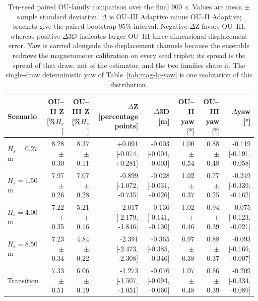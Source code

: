 
\begin{table}[t]
  \centering
  \caption{Ten-seed paired OU-family comparison over the final \SI{900}{s}. Values are mean $\pm$ sample standard deviation. $\Delta$ is OU--III Adaptive minus OU--II Adaptive; brackets give the paired bootstrap 95\% interval. Negative $\Delta$Z favors OU--III, whereas positive $\Delta$3D indicates larger OU--III three-dimensional displacement error. Yaw is carried alongside the displacement channels because the ensemble redraws the magnetometer calibration on every seed triplet: its spread is the spread of that draw, not of the estimator, and the two families share it. The single-draw deterministic yaw of Table~\ref{tab:mag-hi-yaw} is one realization of this distribution.}
  \label{tab:ou_mc_family}
  \footnotesize
  \setlength{\tabcolsep}{4.0pt}
  \begin{tabular}{@{}lrrrrrrr@{}}
    \toprule
    Scenario & OU--II Z [\%$H_s$] & OU--III Z [\%$H_s$] & $\Delta$Z [percentage points] & $\Delta$3D [m] & OU--II yaw [\si{\degree}] & OU--III yaw [\si{\degree}] & $\Delta$yaw [\si{\degree}] \\
    \midrule
    $H_s=0.27$ m & 8.28 $\pm$ 0.30 & 8.37 $\pm$ 0.11 & +0.091 [-0.074, +0.281] & -0.003 [-0.004, -0.003] & 1.00 $\pm$ 0.54 & 0.88 $\pm$ 0.48 & -0.119 [-0.191, -0.058] \\
    $H_s=1.50$ m & 7.97 $\pm$ 0.26 & 7.07 $\pm$ 0.28 & -0.899 [-1.072, -0.735] & -0.028 [-0.031, -0.026] & 1.02 $\pm$ 0.37 & 0.77 $\pm$ 0.25 & -0.249 [-0.339, -0.162] \\
    $H_s=4.00$ m & 7.22 $\pm$ 0.35 & 5.21 $\pm$ 0.16 & -2.017 [-2.179, -1.846] & -0.136 [-0.141, -0.130] & 1.02 $\pm$ 0.46 & 0.94 $\pm$ 0.39 & -0.075 [-0.123, -0.021] \\
    $H_s=8.50$ m & 7.23 $\pm$ 0.34 & 4.84 $\pm$ 0.22 & -2.391 [-2.473, -2.308] & -0.365 [-0.385, -0.346] & 0.97 $\pm$ 0.38 & 0.88 $\pm$ 0.37 & -0.093 [-0.169, -0.007] \\
    Transition & 7.33 $\pm$ 0.51 & 6.06 $\pm$ 0.19 & -1.273 [-1.507, -1.051] & -0.076 [-0.094, -0.060] & 1.07 $\pm$ 0.48 & 0.86 $\pm$ 0.39 & -0.209 [-0.334, -0.089] \\
    \bottomrule
  \end{tabular}
\end{table}

